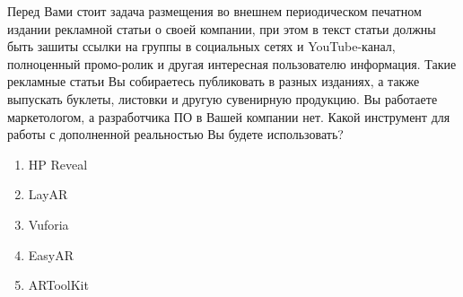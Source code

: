 
Перед Вами стоит задача размещения во внешнем периодическом печатном издании рекламной статьи о своей компании, при этом в текст статьи должны быть зашиты ссылки на группы в социальных сетях и YouTube-канал, полноценный промо-ролик и другая интересная пользователю информация. Такие рекламные статьи Вы собираетесь публиковать в разных изданиях, а также выпускать буклеты, листовки и другую сувенирную продукцию. Вы работаете маркетологом, а разработчика ПО в Вашей компании нет. Какой инструмент для работы с дополненной реальностью Вы будете использовать?

\begin{enumerate}
    \item HP Reveal
    \item LayAR
    \item Vuforia
    \item EasyAR
    \item ARToolKit
\end{enumerate}